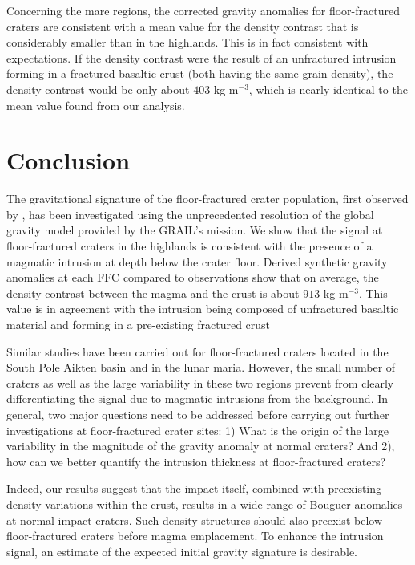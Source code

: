 Concerning  the  mare regions,  the  corrected  gravity anomalies  for
floor-fractured  craters are  consistent  with a  mean  value for  the
density contrast that  is considerably smaller than  in the highlands.
This is in fact consistent with expectations.  If the density contrast
were the  result of  an unfractured intrusion  forming in  a fractured
basaltic  crust (both  having  the same  grain  density), the  density
contrast  would be  only  about  $403$ kg  m$^{-3}$,  which is  nearly
identical to the mean value found from our analysis.

\section{Conclusion}
\label{C6-sec:conclusion}

The gravitational signature of  the floor-fractured crater population,
first observed by \citet{Schultz:1976kt},  has been investigated using
the unprecedented resolution  of the global gravity  model provided by
the  GRAIL's mission.   We  show that  the  signal at  floor-fractured
craters in the highlands is consistent with the presence of a magmatic
intrusion at depth below the  crater floor.  Derived synthetic gravity
anomalies at each  FFC compared to observations show  that on average,
the density contrast between the magma and the crust is about $913$ kg
m$^{-3}$. This value is in agreement with the intrusion being composed
of  unfractured  basaltic  material  and  forming  in  a  pre-existing
fractured crust \citep{Wieczorek:2013ipa}

Similar  studies have  been  carried out  for floor-fractured  craters
located  in the  South  Pole  Aikten basin  and  in  the lunar  maria.
However, the small number of craters  as well as the large variability
in these two  regions prevent from clearly  differentiating the signal
due to magmatic intrusions from the background.  In general, two major
questions   need  to   be  addressed   before  carrying   out  further
investigations at floor-fractured crater sites:  1) What is the origin
of the  large variability in the  magnitude of the gravity  anomaly at
normal  craters? And  2),  how  can we  better  quantify the  intrusion
thickness at floor-fractured craters?

Indeed,  our results  suggest that  the impact  itself, combined  with
preexisting density  variations within  the crust,  results in  a wide
range of  Bouguer anomalies  at normal  impact craters.   Such density
structures should  also preexist below floor-fractured  craters before
magma emplacement.   To enhance the  intrusion signal, an  estimate of
the expected initial gravity signature is desirable.

